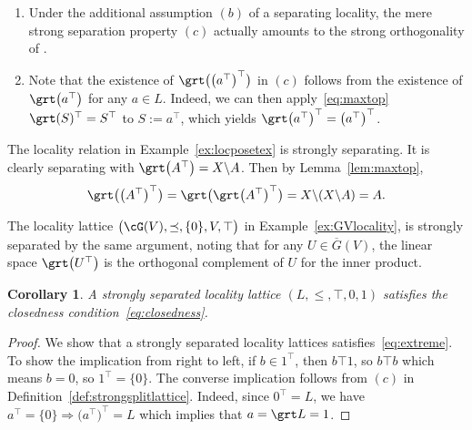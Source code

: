 \documentclass[10pt,a4paper]{amsart}
\numberwithin{equation}{section}
\newtheorem{Corollary}[Theorem]{Corollary}
\newcommand{\loc}{locality\xspace}
\newcommand{\pone}{separating\xspace }
\def \ptwob {separated\xspace }
\begin{document}
 \begin{Remark}\qquad
 \begin{enumerate}\itemsep=0pt
 		\item[$(a)$] Under the additional assumption $(b)$ of a separating locality, the mere strong separation property $(c)$ actually amounts to the strong orthogonality of \cite[Definition~2.3]{CM}.
 		\item[$(b)$] Note that the existence of $\grt\big(\big(a^\top\big)^\top\big)$ in $(c)$ follows from the existence of $\grt\big(a^\top\big)$ for any $a\in L$. Indeed, we can then apply~\eqref{eq:maxtop} $\grt(S)^{\top}=S^{\top}$ to $S:=a^\top$, which yields $\grt\big(a^\top\big)^\top= \big(a^\top\big)^\top$.
 \end{enumerate}
 \end{Remark}

\begin{Example}
	The \loc relation in Example~\ref{ex:locposetex} is strongly \pone. It is clearly \pone with $\grt\big(A^\top\big)=X\backslash A$.
	Then by Lemma~\ref{lem:maxtop},
	\begin{gather*}
\grt \big(\big(A^\top\big)^\top\big)=\grt\big( \grt\big(A^\top\big)^\top\big)=X\backslash (X\backslash A)=A.
\end{gather*}
\end{Example}
\begin{Example}
The \loc lattice $\big(\cG(V), \preceq, \{0\}, V, \top \big)$ in Example~\ref{ex:GVlocality}, is strongly \ptwob by the same argument, noting that for any $U\in \overline G(V)$, the linear space $\grt\big(U^\top\big)$ is the orthogonal complement of $U$ for the inner product.
\end {Example}
	

\begin{Corollary} %
A strongly separated locality lattice $(L, \leq,\top,0,1)$ satisfies the closedness condition~\eqref{eq:closedness}.
\end{Corollary}
\begin{proof} We show that a strongly separated locality lattices satisfies~\eqref{eq:extreme}.
To show the implication from right to left, if $b\in 1^\top$, then $b\top 1$, so $b\top b$ which means $b=0$, so $1^\top =\{0\}$. The converse implication follows from $(c)$ in Definition~\ref{def:strongsplitlattice}. Indeed, since $0^\top=L$, we have $a^\top=\{0\}\Rightarrow \big(a^\top\big)^\top=L$ which implies that $a=\grt L=1$.
\end{proof}
\end{document}
